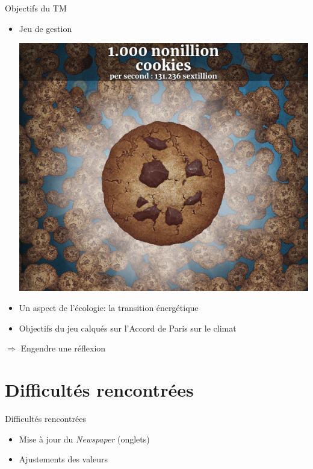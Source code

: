 \documentclass[11pt]{beamer}
\newcommand{\pauseditemize}{\pause \begin{itemize}[<+->]}
\begin{document}
\begin{frame}{Objectifs du TM}

\pauseditemize
	\item Jeu de gestion
	\begin{center}
		\includegraphics[scale=.15]{../images/cookieClicker}
	\end{center}
	\item Un aspect de l'écologie: la transition énergétique
	\item Objectifs du jeu calqués sur l'Accord de Paris sur le climat
\end{itemize}
\pause
\begin{center}
$\Rightarrow$ Engendre une réflexion
\end{center}
	
\end{frame}

\section{Difficultés rencontrées}

\begin{frame}{Difficultés rencontrées}

\pauseditemize
	\item Mise à jour du \textit{Newspaper} (onglets)
	\item Ajustements des valeurs
\end{itemize}

\end{frame}
\end{document}
